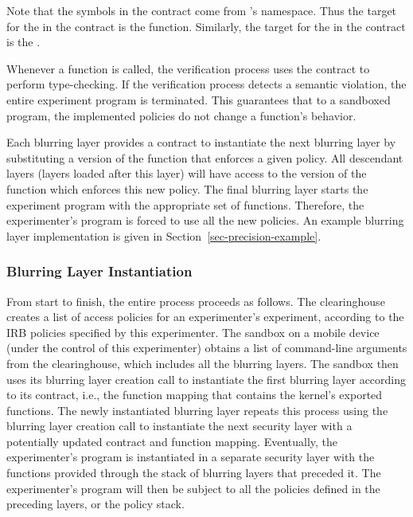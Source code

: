Note that the symbols in the contract come from 's 
namespace. Thus the target for the  in the 
contract is the  function. Similarly, the 
target for the  in the contract is the 
.

Whenever a function is called, the verification process uses the 
contract to perform type-checking. If the verification process 
detects a semantic violation, the entire experiment program is 
terminated. This guarantees that to a sandboxed program, 
the implemented policies do not change a function's behavior.


Each blurring layer provides a contract to instantiate the 
next blurring layer by substituting a version of the function that 
enforces a given policy. All descendant layers (layers loaded 
after this layer) will have access to the version of the function 
which enforces this new policy. The final blurring layer starts the 
experiment program with the appropriate set of functions. 
Therefore, the experimenter's program is forced to use all the 
new policies. An example blurring layer implementation is given in 
Section~\ref{sec-precision-example}.  

\subsubsection{Blurring Layer Instantiation}

From start to finish, the entire process proceeds as follows. 
The clearinghouse creates a list of access policies for an experimenter's
experiment, according to the IRB policies specified by this 
experimenter. The sandbox on a mobile device (under the control of
this experimenter) obtains a list of command-line arguments 
from the clearinghouse, which includes all the blurring layers.
The sandbox then uses its blurring layer creation call to instantiate 
the first blurring layer according to its contract, i.e., the function 
mapping that contains the kernel's exported functions.
The newly instantiated blurring layer repeats this process using the 
blurring layer creation call to instantiate the next
security layer with a potentially updated contract and function
mapping. Eventually, the experimenter's program is instantiated
in a separate security layer with the functions provided
through the stack of blurring layers that preceded it.
The experimenter's program will then be subject to all the 
policies defined in the preceding layers, or the policy stack.

